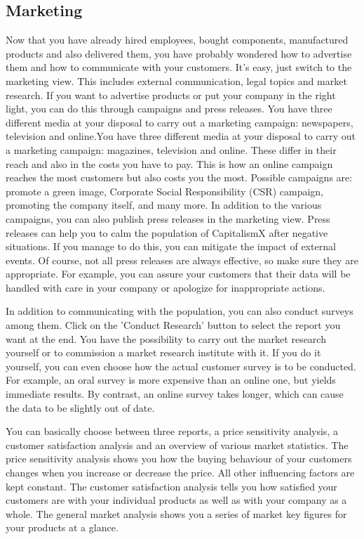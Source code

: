 \subsection{Marketing} \label{marketing_manual}

Now that you have already hired employees, bought components, manufactured products and also delivered them, you have probably wondered how to advertise them and how to communicate with your customers. It's easy, just switch to the marketing view. This includes external communication, legal topics and market research.
If you want to advertise products or put your company in the right light, you can do this through campaigns and press releases. You have three different media at your disposal to carry out a marketing campaign: newspapers, television and online.You have three different media at your disposal to carry out a marketing campaign: magazines, television and online. These differ in their reach and also in the costs you have to pay. This is how an online campaign reaches the most customers but also costs you the most. Possible campaigns are: promote a green image, Corporate Social Responsibility (\gls{CSR}) campaign, promoting the company itself, and many more.
In addition to the various campaigns, you can also publish press releases in the marketing view. Press releases can help you to calm the population of CapitalismX after negative situations. If you manage to do this, you can mitigate the impact of external events. Of course, not all press releases are always effective, so make sure they are appropriate. 
For example, you can assure your customers that their data will be handled with care in your company or apologize for inappropriate actions.

In addition to communicating with the population, you can also conduct surveys among them. Click on the 'Conduct Research' button to select the report you want at the end. You have the possibility to carry out the market research yourself or to commission a market research institute with it. If you do it yourself, you can even choose how the actual customer survey is to be conducted. For example, an oral survey is more expensive than an online one, but yields immediate results.  By contrast, an online survey takes longer, which can cause the data to be slightly out of date.

You can basically choose between three reports, a price sensitivity analysis, a customer satisfaction analysis and an overview of various market statistics. The price sensitivity analysis shows you how the buying behaviour of your customers changes when you increase or decrease the price. All other influencing factors are kept constant. The customer satisfaction analysis tells you how satisfied your customers are with your individual products as well as with your company as a whole. The general market analysis shows you a series of market key figures for your products at a glance. 

